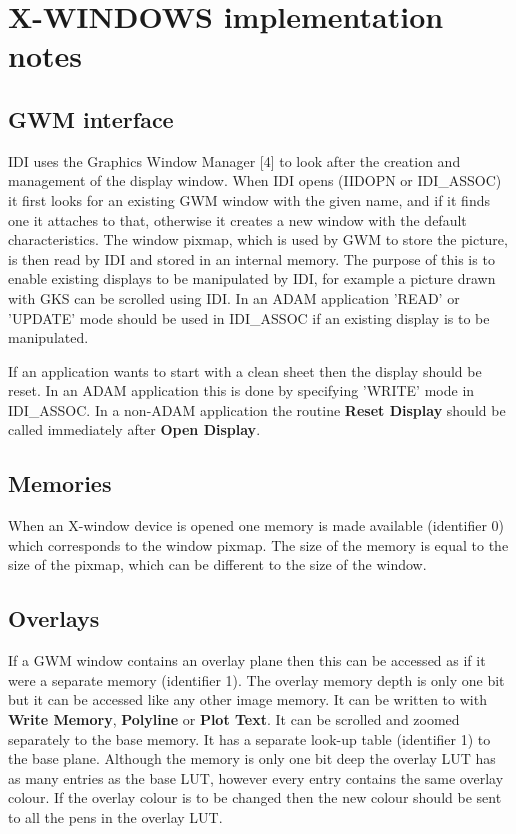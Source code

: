\newpage
\section{X-WINDOWS implementation notes}
\label{se:xin}

\subsection{GWM interface}

IDI uses the Graphics Window Manager [4] to look after the creation
and management of the display window. When IDI opens (IIDOPN or IDI\_ASSOC)
it first looks for an existing GWM window with the given name, and if
it finds one it attaches to that, otherwise it creates a new window with
the default characteristics. The window pixmap, which is used by GWM to
store the picture, is then read by IDI and stored in an internal memory.
The purpose of this is to enable existing displays to be manipulated by
IDI, for example a picture drawn with GKS can be scrolled using IDI.
In an ADAM application 'READ' or 'UPDATE' mode should be used in
IDI\_ASSOC if an existing display is to be manipulated.

If an application wants to start with a clean sheet then the display
should be reset. In an ADAM application this is done by specifying
'WRITE' mode in IDI\_ASSOC. In a non-ADAM application the routine
{\bf Reset Display} should be called immediately after {\bf Open
Display}.

\subsection{Memories}

When an X-window device is opened one memory is made available
(identifier 0) which corresponds to the window pixmap. The size of the
memory is equal to the size of the pixmap, which can be different to
the size of the window.

\subsection{Overlays}

If a GWM window contains an overlay plane then this can be accessed as
if it were a separate memory (identifier 1). The overlay memory depth
is only one bit but it can be accessed like any other image memory.
It can be written to with {\bf Write Memory}, {\bf Polyline} or
{\bf Plot Text}. It can be scrolled and zoomed separately to the base
memory. It has a separate look-up table (identifier 1) to the base
plane. Although the memory is only one bit deep the overlay LUT has as
many entries as the base LUT, however every entry contains the same
overlay colour. If the overlay colour is to be changed then the new
colour should be sent to all the pens in the overlay LUT.

